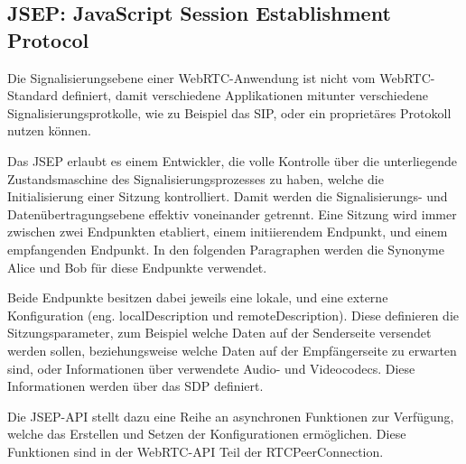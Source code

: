 
\subsection{JSEP: JavaScript Session Establishment Protocol}
Die Signalisierungsebene einer \acs{WebRTC}-Anwendung ist nicht vom \acs{WebRTC}-Standard definiert, damit verschiedene Applikationen mitunter verschiedene Signalisierungsprotkolle, wie zu Beispiel das \acf{SIP}, oder ein proprietäres Protokoll nutzen können.\par

Das \acf{JSEP} erlaubt es einem Entwickler, die volle Kontrolle über die unterliegende Zustandsmaschine des Signalisierungsprozesses zu haben, welche die Initialisierung einer Sitzung kontrolliert. Damit werden die Signalisierungs- und Datenübertragungsebene effektiv voneinander getrennt. Eine Sitzung wird immer zwischen zwei Endpunkten etabliert, einem initiierendem Endpunkt, und einem empfangenden Endpunkt. In den folgenden Paragraphen werden die Synonyme \glqq{}Alice\grqq{} und \glqq{}Bob\grqq{} für diese Endpunkte verwendet.\par

Beide Endpunkte besitzen dabei jeweils eine lokale, und eine externe Konfiguration (eng. \glqq{}localDescription\grqq{} und \glqq{}remoteDescription\grqq{}). Diese definieren die Sitzungsparameter, zum Beispiel welche Daten auf der Senderseite versendet werden sollen, beziehungsweise welche Daten auf der Empfängerseite zu erwarten sind, oder Informationen über verwendete Audio- und Videocodecs. Diese Informationen werden über das \acf{SDP} definiert.\par

Die \acs{JSEP}-\acs{API} stellt dazu eine Reihe an asynchronen Funktionen zur Verfügung, welche das Erstellen und Setzen der Konfigurationen ermöglichen. Diese Funktionen sind in der \acs{WebRTC}-\acs{API} Teil der RTCPeerConnection.\par

